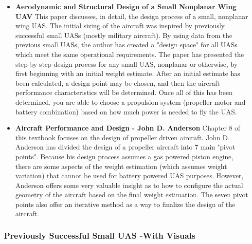 \documentclass[]{article}
\begin{document}
\begin{itemize}

\item {\bf Aerodynamic and Structural Design of a Small Nonplanar Wing UAV} \cite{Lan08} This paper discusses, in detail, the design process of a small, nonplanar wing UAS. The initial sizing of the aircraft was inspired by previously successful small UASs (mostly military aircraft).  By using data from the previous small UASs, the author has created a "design space" for all UASs which meet the same operational requirements.  The paper has presented the step-by-step design process for any small UAS, nonplanar or otherwise, by first beginning with an initial weight estimate.  After an initial estimate has been calculated, a design point may be chosen, and then the aircraft performance characteristics will be determined.  Once all of this has been determined, you are able to choose a propulsion system (propeller motor and battery combination) based on how much power is needed to fly the UAS. 

\item {\bf Aircraft Performance and Design - John D. Anderson} \cite{And99} Chapter 8 of this textbook focuses on the design of propeller driven aircraft.  John D. Anderson has divided the design of a propeller aircraft into 7 main "pivot points".  Because his design process assumes a gas powered piston engine, there are some aspects of the weight estimation (which assumes weight variation) that cannot be used for battery powered UAS purposes.  However, Anderson offers some very valuable insight as to how to configure the actual geometry of the aircraft based on the final weight estimation.  The seven pivot points also offer an iterative method as a way to finalize the design of the aircraft.

\end{itemize}

\subsubsection{Previously Successful Small UAS -With Visuals}
\end{document}
